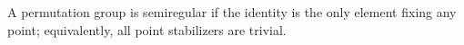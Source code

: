 A permutation group is semiregular if the identity is the only element fixing any point; equivalently, all point stabilizers are trivial.
